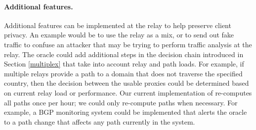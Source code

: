 \paragraph{Additional features.}  Additional features can be
implemented at the relay to help preserve client privacy.  An example
would be to use the relay as a mix, or to send out fake traffic to
confuse an attacker that may be trying to perform traffic analysis at
the relay.  The oracle could add additional steps in the decision chain
introduced in Section \ref{multiplex} that take into account relay and
path loads.  For example, if multiple relays provide a path to a domain
that does not traverse the specified country, then the decision between
the usable proxies could be determined based on current relay load or
performance.
Our current implementation of \system{} 
re-computes all paths once per hour; we could only re-compute 
paths when necessary.  For example, a BGP monitoring system could be implemented 
that alerts the oracle to a path change that affects any path currently in 
the system.  
